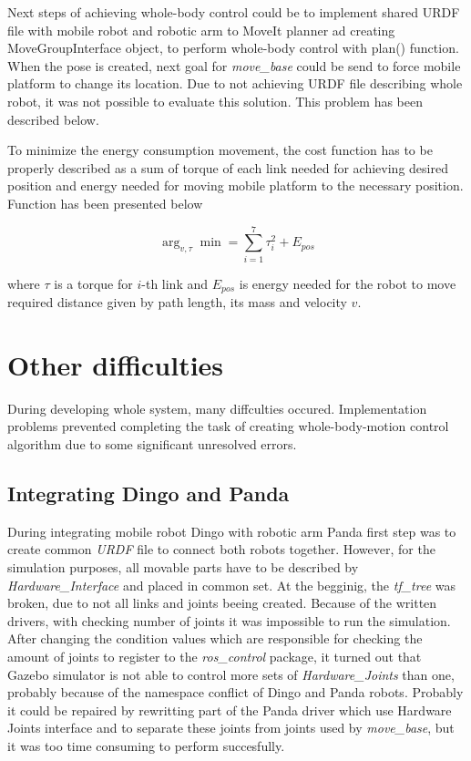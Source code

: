 \documentclass[conference,a4paper]{IEEEtran}
\begin{document}
Next steps of achieving whole-body control could be to implement shared URDF file with mobile robot and robotic arm to MoveIt planner ad creating MoveGroupInterface object, to perform whole-body control with plan() function.
When the pose is created, next goal for \textit{move\_base} could be send to force mobile platform to change its location. Due to not achieving URDF file describing whole robot, it was not possible to evaluate this solution. This problem has been described below.

To minimize the energy consumption movement, the cost function has to be properly described as a sum of torque of each link needed for achieving desired position and energy needed for moving mobile platform to the necessary position. Function has been presented below

\begin{equation}
\arg_{v,\tau} \min = \sum_{i=1}^{7} \tau_i^2 + E_{pos}
\end{equation}

where $\tau$ is a torque for $i$-th link and $E_{pos}$ is energy needed for the robot to move required distance given by path length, its mass and velocity $v$.

\section{Other difficulties}
During developing whole system, many diffculties occured. Implementation problems prevented completing the task of creating whole-body-motion control algorithm due to some significant unresolved errors.

\subsection{Integrating Dingo and Panda}
During integrating mobile robot Dingo with robotic arm Panda first step was to create common \textit{URDF} file to connect both robots together. However, for the simulation purposes, all movable parts have to be described by \textit{Hardware\_Interface}
and placed in common set. At the begginig, the \textit{tf\_tree} was broken, due to not all links and joints beeing created. Because of the written drivers, with checking number of joints it was impossible to run the simulation. After changing the condition values which are responsible for checking the amount of joints to register to the \textit{ros\_control} package, it turned out that Gazebo simulator is not able to control more sets of \textit{Hardware\_Joints}
than one, probably because of the namespace conflict of Dingo and Panda robots. Probably it could be repaired by rewritting part of the Panda driver which use Hardware Joints interface and to separate these joints from joints used by \textit{move\_base}, but it was too time consuming to perform succesfully.
\end{document}
